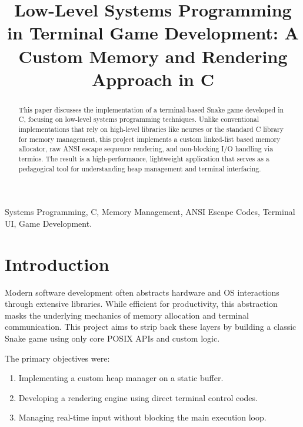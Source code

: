 \documentclass[conference]{IEEEtran}
\begin{document}
\title{Low-Level Systems Programming in Terminal Game Development: A Custom Memory and Rendering Approach in C}

\author{
\and
{}
}

\maketitle

\begin{abstract}
This paper discusses the implementation of a terminal-based Snake game developed in C, focusing on low-level systems programming techniques. Unlike conventional implementations that rely on high-level libraries like ncurses or the standard C library for memory management, this project implements a custom linked-list based memory allocator, raw ANSI escape sequence rendering, and non-blocking I/O handling via termios. The result is a high-performance, lightweight application that serves as a pedagogical tool for understanding heap management and terminal interfacing.
\end{abstract}

\begin{IEEEkeywords}
Systems Programming, C, Memory Management, ANSI Escape Codes, Terminal UI, Game Development.
\end{IEEEkeywords}

\section{Introduction}
Modern software development often abstracts hardware and OS interactions through extensive libraries. While efficient for productivity, this abstraction masks the underlying mechanics of memory allocation and terminal communication. This project aims to strip back these layers by building a classic Snake game using only core POSIX APIs and custom logic.

The primary objectives were:
\begin{enumerate}
\item Implementing a custom heap manager on a static buffer.
\item Developing a rendering engine using direct terminal control codes.
\item Managing real-time input without blocking the main execution loop.
\end{enumerate}
\end{document}
